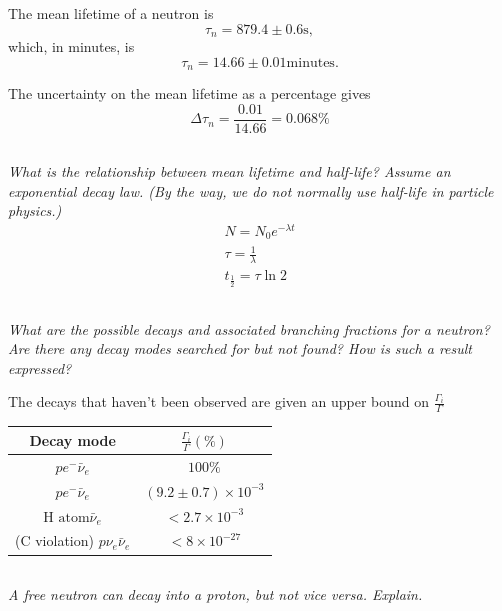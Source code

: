 \documentclass[12pt, letterpaper]{article}
\begin{document}
The mean lifetime of a neutron is
$$
\tau_n =879.4 \pm 0.6 \mathrm s ,
$$
which, in minutes, is
$$
\tau_n=14.66 \pm 0.01 \text {minutes}.
$$

The uncertainty on the mean lifetime as a percentage gives 
$$
\Delta \tau_n = \frac{0.01}{14.66}=0.068 \%
$$

\subsection{}
\textit{What is the relationship between mean lifetime and half-life? Assume an exponential decay law. (By the way, we do not normally use half-life in particle physics.)}
$$
\begin{array}{l}
N=N_{0} e^{-\lambda t} \\
\tau=\frac{1}{\lambda} \\
t_{\frac{1}{2}}=\tau \ln 2
\end{array}
$$

\subsection{}
\textit{What are the possible decays and associated branching fractions for a neutron? Are there any decay modes searched for but not found? How is such a result expressed?}

The decays that haven't been observed are given an upper bound on $\frac{\Gamma_{i}}{\Gamma}$
\begin{center}
\begin{tabular}{ |c||c| } 
\hline \hline
 Decay mode                  & $\frac{\Gamma_i}{\Gamma} \left(\%\right)$\\
 \hline \hline
    ${p e^{-} \bar{\nu}_e}$             & $100\%$\\
    ${p e^{-} \bar{\nu}_e}$              & $(9.2 \pm 0.7) \times 10^{-3}$\\
    $\text{H atom} \bar\nu_e$              & $< 2.7 \times 10^{-3}$\\
    (C violation) $p \nu_e \bar\nu_e$  & $<8 \times 10^{-27}$\\ 
\hline \hline
\end{tabular}
\end{center}

\subsection{}
\textit{A free neutron can decay into a proton, but not vice versa. Explain.}
\end{document}
